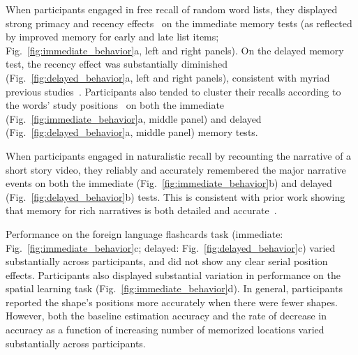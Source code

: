 \documentclass[10pt]{article}
\begin{document}
When participants engaged in free recall of random word lists, they
displayed strong primacy and recency effects~\citep{Murd62a} on the
immediate memory tests (as reflected by improved memory for early and
late list items; Fig.~\ref{fig:immediate_behavior}a, left and right
panels).  On the delayed memory test, the recency effect was
substantially diminished (Fig.~\ref{fig:delayed_behavior}a, left and
right panels), consistent with myriad previous studies~\citep[for
review see][]{Kaha12}.  Participants also tended to cluster their
recalls according to the words' study positions~\citep{Kaha96} on both
the immediate (Fig.~\ref{fig:immediate_behavior}a, middle panel) and
delayed (Fig.~\ref{fig:delayed_behavior}a, middle panel) memory tests.

When participants engaged in naturalistic recall by recounting the
narrative of a short story video, they reliably and accurately
remembered the major narrative events on both the immediate
(Fig.~\ref{fig:immediate_behavior}b) and delayed
(Fig.~\ref{fig:delayed_behavior}b) tests.  This is consistent with
prior work showing that memory for rich narratives is both detailed
and accurate~\citep{HeusEtal21, ChenEtal17}.

Performance on the foreign language flashcards task (immediate:
Fig.~\ref{fig:immediate_behavior}c; delayed:
Fig.~\ref{fig:delayed_behavior}c) varied substantially across
participants, and did not show any clear serial position effects.
Participants also displayed substantial variation in performance on
the spatial learning task (Fig.~\ref{fig:immediate_behavior}d).  In
general, participants reported the shape's positions more accurately
when there were fewer shapes.  However, both the baseline estimation accuracy and
the rate of decrease in accuracy as a function of increasing number of
memorized locations varied substantially across participants.
\end{document}

